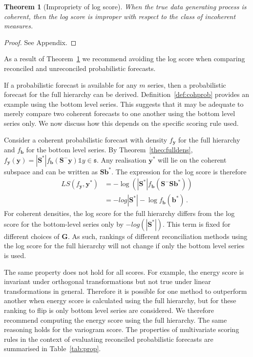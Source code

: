 \documentclass[12pt]{article}
\newtheorem{theo}{Theorem}[section]
\theoremstyle{definition}
\begin{document}
\begin{theo}[Impropriety of log score]\label{theo:logS_improp}
	When the true data generating process is coherent, then the log score is improper with respect to the class of incoherent measures.
\end{theo}

\begin{proof}
	See Appendix.
\end{proof}

As a result of Theorem~\ref{theo:logS_improp} we recommend avoiding the log score when comparing reconciled and unreconciled probabilistic forecasts.

If a probabilistic forecast is available for any $m$ series, then a probabilistic forecast for the full hierarchy can be derived.  Definition~\ref{def:cohprob} provides an example using the bottom level series. This suggests that it may be adequate to merely compare two coherent forecasts to one another using the bottom level series only. We now discuss how this depends on the specific scoring rule used.

Consider a coherent probabilistic forecast with density $f_{\bm{y}}$ for the full hierarchy and  $f_{\bm{b}}$ for the bottom level series. By Theorem~\ref{theo:fulldens}, $f_{\bm{y}}(\bm{y})=|\bm{S}^*|f_{\bm{b}}(\bm{S}^-\bm{y})\mathbb{1}{y\in\mathfrak{s}}$.  Any realisation $\bm{y}^*$ will lie on the coherent subspace and can be written as $\bm{S}\bm{b}^*$.  The expression for the log score is therefore
\begin{align}
LS(f_{\bm y},\bm{y}^*)&=-\log\left(|\bm{S}^*|f_{\bm{b}}(\bm{S}^-\bm{S}\bm{b}^*)\right)\nonumber\\
&=-log|\bm{S}^*|-\log f_{\bm{b}}(\bm{b}^*)\,.\nonumber
\end{align}
For coherent densities, the log score for the full hierarchy differs from the log score for the bottom-level series only by $-log(|\bm{S}^*|)$. This term is fixed for different choices of ${\bm G}$. As such, rankings of different reconciliation methods using the log score for the full hierarchy will not change if only the bottom level series is used.

The same property does not hold for all scores. For example, the energy score is invariant under orthogonal transformations \citep{Szekely2013,Gneiting2007} but not true under linear transformations in general. Therefore it is possible for one method to outperform another when energy score is calculated using the full hierarchy, but for these ranking to flip is only bottom level series are considered.  We therefore recommend computing the energy score using the full hierarchy.  The same reasoning holds for the variogram score.  The properties of multivariate scoring rules in the context of evaluating reconciled probabilistic forecasts are summarised in Table~\ref{tab:prop}.
\end{document}
